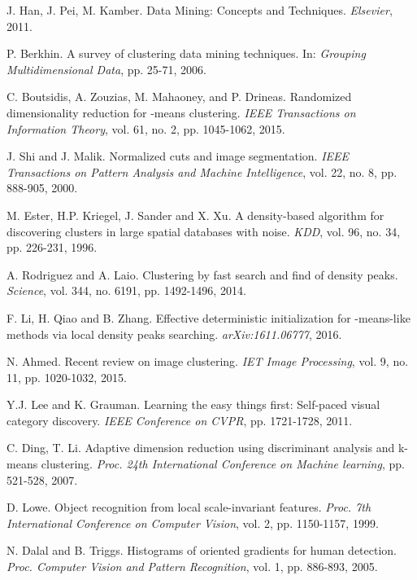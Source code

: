 \documentclass[preprint,12pt]{elsarticle}
\begin{document}
\begin{thebibliography}{99} 

J. Han, J. Pei, M. Kamber. Data Mining: Concepts and Techniques.
\textit{Elsevier}, 2011.

P. Berkhin. A survey of clustering data mining techniques.
In: \textit{Grouping Multidimensional Data}, pp. 25-71, 2006.

C. Boutsidis, A. Zouzias, M. Mahaoney, and P. Drineas. Randomized dimensionality reduction for -means clustering.
\textit{IEEE Transactions on Information Theory}, vol. 61, no. 2, pp. 1045-1062, 2015.

J. Shi and J. Malik. Normalized cuts and image segmentation.
\textit{IEEE Transactions on Pattern Analysis and Machine Intelligence}, vol. 22, no. 8, pp. 888-905, 2000.

 M. Ester, H.P. Kriegel, J. Sander and X. Xu.
A density-based algorithm for discovering clusters in large spatial databases with noise.
\textit{KDD}, vol. 96, no. 34, pp. 226-231, 1996.

A. Rodriguez and A. Laio. Clustering by fast search and find of density peaks.
\textit{Science}, vol. 344, no. 6191, pp. 1492-1496, 2014.

F. Li, H. Qiao and B. Zhang. Effective deterministic initialization for -means-like methods via
local density peaks searching. \textit{arXiv:1611.06777}, 2016.

N. Ahmed. Recent review on image clustering.
\textit{IET Image Processing}, vol. 9, no. 11, pp. 1020-1032, 2015.

Y.J. Lee and K. Grauman. Learning the easy things first: Self-paced visual category discovery.
\textit{IEEE Conference on CVPR}, pp. 1721-1728, 2011.

C. Ding, T. Li. Adaptive dimension reduction using discriminant analysis and k-means clustering.
\textit{Proc. 24th International Conference on Machine learning}, pp. 521-528, 2007.

D. Lowe. Object recognition from local scale-invariant features.
\textit{Proc. 7th International Conference on Computer Vision}, vol. 2, pp. 1150-1157, 1999.

N. Dalal and B. Triggs. Histograms of oriented gradients for human detection.
\textit{Proc. Computer Vision and Pattern Recognition}, vol. 1, pp. 886-893, 2005.


\end{thebibliography}
\end{document}
